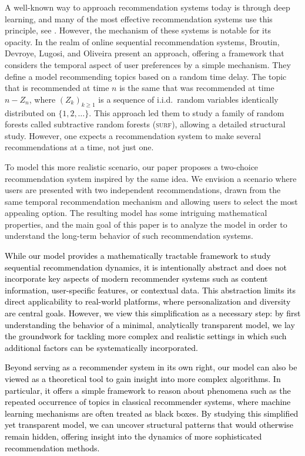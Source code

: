 \documentclass[12pt]{article}
\numberwithin{equation}{section} \font\titre=cmbx12
\begin{document}
A well-known way to approach recommendation systems today is through
deep learning, and many of the most effective recommendation systems
use this principle, see \cite{deeplearning}. However, the mechanism of
these systems is notable for its opacity. In the realm of online
sequential recommendation systems, Broutin, Devroye, Lugosi, and
Oliveira \cite{surf} present an approach, offering a
framework that considers the temporal aspect of user preferences by a
simple mechanism.  They define a model recommending topics based on a
random time delay. The topic that is recommended at time $n$ is the
same that was recommended at time $n-Z_n$, where $(Z_k)_{k\ge 1}$ is a
sequence of i.i.d.\ random variables identically distributed on
$\{1,2,\ldots\}$. This approach led them to study a family of random
forests called subtractive random forests (\textsc{surf}), allowing a
detailed structural study. However, one expects a recommendation
system to make several recommendations at a time, not just one.

To model this more realistic scenario, our paper proposes a two-choice
recommendation system inspired by the same idea. We envision a
scenario where users are presented with two independent
recommendations, drawn from the same temporal recommendation mechanism
and allowing users to select the most appealing option.
The resulting model has some intriguing mathematical properties, and the main goal of this paper
is to analyze the model in order to understand the long-term behavior of such recommendation systems.

\textcolor{black}{While our model provides a mathematically tractable framework to study sequential recommendation dynamics, it is intentionally abstract and does not incorporate key aspects of modern recommender systems such as content information, user-specific features, or contextual data. This abstraction limits its direct applicability to real-world platforms, where personalization and diversity are central goals. However, we view this simplification as a necessary step: by first understanding the behavior of a minimal, analytically transparent model, we lay the groundwork for tackling more complex and realistic settings in which such additional factors can be systematically incorporated.}

\textcolor{black}{Beyond serving as a recommender system in its own right, our model can also be viewed as a theoretical tool to gain insight into more complex algorithms. In particular, it offers a simple framework to reason about phenomena such as the repeated occurrence of topics in classical recommender systems, where machine learning mechanisms are often treated as black boxes.
By studying this simplified yet transparent model, we can uncover structural patterns that would otherwise remain hidden, offering insight into the dynamics of more sophisticated recommendation methods.}
\end{document}
